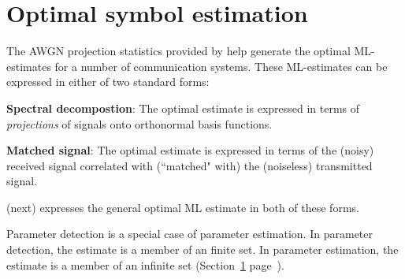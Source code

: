 \section{Optimal symbol estimation}
\label{sec:awgn_est}
The AWGN projection statistics provided by 
 help generate the optimal 
ML-estimates for a number of communication systems.
These ML-estimates can be expressed in either of two standard forms:
\begin{liste}
  \item {\bf Spectral decompostion}: 
     The optimal estimate is expressed in terms of {\em projections}
     of signals onto orthonormal basis functions.
  \item {\bf Matched signal}:
     The optimal estimate is expressed in terms of the (noisy)
     received signal correlated with (``matched" with)
     the (noiseless) transmitted signal.
\end{liste}
 (next) expresses the general 
optimal ML estimate in both of these forms.

Parameter detection is a special case of parameter estimation.
In parameter detection, the estimate is a member of an finite set.
In parameter estimation, the estimate is a member of an infinite set
(Section~\ref{sec:awgn_est} page~\pageref{sec:awgn_est}).


